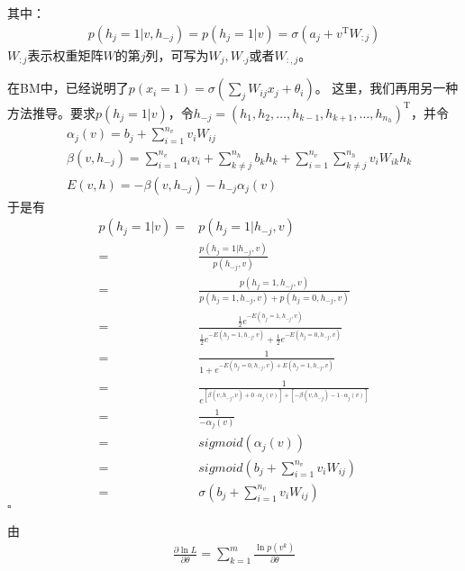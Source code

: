             其中：
            \begin{align*}
            p(h_j = 1|v,h_{-j}) = p(h_j=1|v) = \sigma(a_j+v^\mathrm{T}W_{:j})
            \end{align*}
            $W_{:j}$表示权重矩阵$W$的第$j$列，可写为$W_j,W_{\cdot j}$或者$W_{:,j}$。
            \begin{remark}
            在BM中，已经说明了$p(x_i=1) = \sigma(\sum_jW_{ij}x_j + \theta_i)$。
            这里，我们再用另一种方法推导。要求$p(h_j=1|v)$，令$h_{-j} = (h_1,h_2,\dots,h_{k-1},h_{k+1},\dots,h_{n_h})^\mathrm{T}$，并令
            \begin{align*}
            & \alpha_j(v) = b_j + \sum_{i = 1}^{n_v}v_i W_{ij}\\
            & \beta(v,h_{-j}) = \sum_{i=1}^{n_v}a_iv_i + \sum_{k\neq j}^{n_h}b_kh_k+\sum_{i=1}^{n_v}\sum_{k\neq j}^{n_h}v_i W_{ik}h_k\\
            & E(v,h) = -\beta(v,h_{-j}) - h_{-j}\alpha_j(v)
            \end{align*}
            于是有
            \begin{align*}
            p(h_j = 1|v)={}& p(h_j=1|h_{-j},v)\\
            ={}& \frac{p(h_j = 1|h_{-j},v)}{p(h_{-j},v)}\\
            ={}& \frac{p(h_j=1,h_{-j},v)}{p(h_j  =1,h_{-j},v)+ p(h_j  =0,h_{-j},v)}\\
            ={}& \frac{\frac{1}{2}e^{-E(h_j=1,h_{-j},v)}}{\frac{1}{2}e^{-E(h_j=1,h_{-j},v)} + \frac{1}{2}e^{-E(h_j=0,h_{-j},v)}}\\
            ={}& \frac{1}{1+ e^{- E(h_j=0,h_{-j},v)+ E(h_j=1,h_{-j},v)}}\\
            ={}& \frac{1}{e^{[\beta(v,h_{-j},v)+ 0\cdot \alpha _j(v)] + [-\beta(v,h_{-j}) - 1\cdot \alpha_j(v)]}}\\
            ={}& \frac{1}{-\alpha_j(v)}\\
            ={}& sigmoid(\alpha_j(v))\\
            ={}& sigmoid \left( b_j + \sum_{i=1}^{n_v}v_iW_{ij} \right) \\
            ={}& \sigma \left( b_j + \sum_{i=1}^{n_v}v_iW_{ij} \right)
            \end{align*}
            $\square$
            \end{remark}
            \par
            由
            \begin{align*}
            \frac{\partial \ln L}{\partial \theta} = \sum_{k=1}^m\frac{\ln p(v^k)}{\partial \theta}
            \end{align*}
